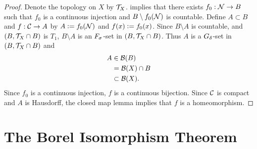 \documentclass{book}
\begin{document}
	\begin{proof}
		Denote the topology on $X$ by $\mathcal{T}_X$.  implies that there exists $f_0: \mathcal{N} \rightarrow B$ such that $f_0$ is a continuous injection and $B \setminus f_0(\mathcal{N})$ is countable. Define $A \subset B$ and $f:\mathcal{C} \rightarrow A$ by $A \vcentcolon= f_0(\mathcal{N})$ and $f(x) \vcentcolon= f_0(x)$. Since $B \setminus A$ is countable, and $(B, \mathcal{T}_X \cap B)$ is $T_1$, $B \setminus A$ is an $F_{\sigma}$-set in $(B, \mathcal{T}_X \cap B)$. Thus $A$ is a $G_{\delta}$-set in $(B, \mathcal{T}_X \cap B)$ and   
		\begin{align*}
			A 
			& \in \mathcal{B}(B) \\
			& = \mathcal{B}(X) \cap B \\
			& \subset \mathcal{B}(X).
		\end{align*}
		Since $f_0$ is a continuous injection, $f$ is a continuous bijection. Since $\mathcal{C}$ is compact and $A$ is Hausdorff, the closed map lemma  implies that $f$ is a homeomorphism.
	\end{proof}
	
	
	
	
	
	
	
	
	
	
	
	
	
	
	
	
	
	
	
	
	
	
	
	
	
	
	
	
	
	
	
	
	
	
	
	
	
	
	
	
	
	
	
	
	
	
	
	
	
	
	
	
	
	
	
	
	
	
	\newpage
	\section{The Borel Isomorphism Theorem}
	
\end{document}
